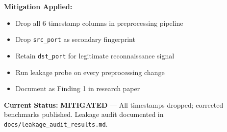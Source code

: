 \documentclass[11pt, a4paper]{article}
\newcommand{\cmark}{\textcolor{accent}{\ding{51}}}
\newcommand{\col}[1]{\texttt{\small #1}}
\begin{document}
\begin{risksheet}
\vspace{0.5em}
\textbf{Mitigation Applied:}
\begin{itemize}[leftmargin=*, nosep]
    \item Drop all 6 timestamp columns in preprocessing pipeline
    \item Drop \col{src\_port} as secondary fingerprint
    \item Retain \col{dst\_port} for legitimate reconnaissance signal
    \item Run leakage probe on every preprocessing change
    \item Document as Finding 1 in research paper
\end{itemize}

\vspace{0.5em}
\textbf{Current Status:} \cmark{} \textcolor{accent}{\textbf{MITIGATED}} --- All timestamps dropped; corrected benchmarks published. Leakage audit documented in \col{docs/leakage\_audit\_results.md}.
\end{risksheet}

\vspace{1.5em}
\end{document}
